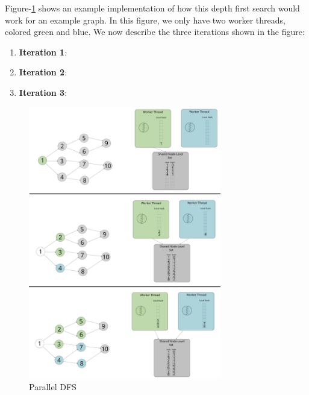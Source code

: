 Figure-\ref{fig:parallelDFS} shows an example implementation of how this
depth first search would work for an example graph. In this figure, we only have
two worker threads, colored green and blue. We now describe the three iterations
shown in the figure:
\begin{enumerate}
    \item \textbf{Iteration 1}:
    \item \textbf{Iteration 2}:
    \item \textbf{Iteration 3}:
\end{enumerate}
\begin{figure}[ht]
    \centering
    \includegraphics[width=0.75\textwidth]{figures/parallelDFS.png}
    \caption{Parallel DFS}
    \label{fig:parallelDFS}
\end{figure}
